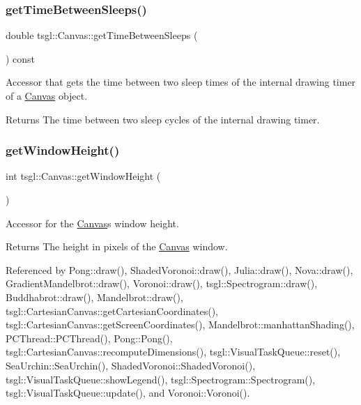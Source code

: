\subsubsection{\texorpdfstring{get\+Time\+Between\+Sleeps()}{getTimeBetweenSleeps()}}
{\footnotesize\ttfamily double tsgl\+::\+Canvas\+::get\+Time\+Between\+Sleeps (\begin{DoxyParamCaption}{ }\end{DoxyParamCaption}) const}



Accessor that gets the time between two sleep times of the internal drawing timer of a \hyperlink{classtsgl_1_1_canvas}{Canvas} object. 

\begin{DoxyReturn}{Returns}
The time between two sleep cycles of the internal drawing timer. 
\end{DoxyReturn}
\mbox{\label{classtsgl_1_1_canvas_ad740ebe5d6bd69ab79cde3e84f369f35}} 
\subsubsection{\texorpdfstring{get\+Window\+Height()}{getWindowHeight()}}
{\footnotesize\ttfamily int tsgl\+::\+Canvas\+::get\+Window\+Height (\begin{DoxyParamCaption}{ }\end{DoxyParamCaption})}



Accessor for the \hyperlink{classtsgl_1_1_canvas}{Canvas}\textquotesingle{}s window height. 

\begin{DoxyReturn}{Returns}
The height in pixels of the \hyperlink{classtsgl_1_1_canvas}{Canvas} window. 
\end{DoxyReturn}


Referenced by Pong\+::draw(), Shaded\+Voronoi\+::draw(), Julia\+::draw(), Nova\+::draw(), Gradient\+Mandelbrot\+::draw(), Voronoi\+::draw(), tsgl\+::\+Spectrogram\+::draw(), Buddhabrot\+::draw(), Mandelbrot\+::draw(), tsgl\+::\+Cartesian\+Canvas\+::get\+Cartesian\+Coordinates(), tsgl\+::\+Cartesian\+Canvas\+::get\+Screen\+Coordinates(), Mandelbrot\+::manhattan\+Shading(), P\+C\+Thread\+::\+P\+C\+Thread(), Pong\+::\+Pong(), tsgl\+::\+Cartesian\+Canvas\+::recompute\+Dimensions(), tsgl\+::\+Visual\+Task\+Queue\+::reset(), Sea\+Urchin\+::\+Sea\+Urchin(), Shaded\+Voronoi\+::\+Shaded\+Voronoi(), tsgl\+::\+Visual\+Task\+Queue\+::show\+Legend(), tsgl\+::\+Spectrogram\+::\+Spectrogram(), tsgl\+::\+Visual\+Task\+Queue\+::update(), and Voronoi\+::\+Voronoi().

